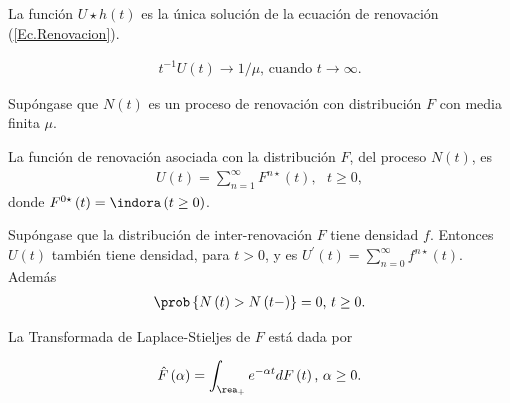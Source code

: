 \begin{Prop}
La funci\'on $U\star h\left(t\right)$ es la \'unica soluci\'on de la ecuaci\'on de renovaci\'on (\ref{Ec.Renovacion}).
\end{Prop}

\begin{Teo}
\begin{eqnarray*}
t^{-1}U\left(t\right)\rightarrow 1/\mu\textrm{,    cuando }t\rightarrow\infty.
\end{eqnarray*}
\end{Teo}

%
%


Sup\'ongase que $N\left(t\right)$ es un proceso de renovaci\'on con distribuci\'on $F$ con media finita $\mu$.

\begin{Def}
La funci\'on de renovaci\'on asociada con la distribuci\'on $F$, del proceso $N\left(t\right)$, es
\begin{eqnarray*}
U\left(t\right)=\sum_{n=1}^{\infty}F^{n\star}\left(t\right),\textrm{   }t\geq0,
\end{eqnarray*}
donde $F^{0\star}\left(t\right)=\indora\left(t\geq0\right)$.
\end{Def}


\begin{Prop}
Sup\'ongase que la distribuci\'on de inter-renovaci\'on $F$ tiene densidad $f$. Entonces $U\left(t\right)$ tambi\'en tiene densidad, para $t>0$, y es $U^{'}\left(t\right)=\sum_{n=0}^{\infty}f^{n\star}\left(t\right)$. Adem\'as
\begin{eqnarray*}
\prob\left\{N\left(t\right)>N\left(t-\right)\right\}=0\textrm{,   }t\geq0.
\end{eqnarray*}
\end{Prop}

\begin{Def}
La Transformada de Laplace-Stieljes de $F$ est\'a dada por

\begin{eqnarray*}
\hat{F}\left(\alpha\right)=\int_{\rea_{+}}e^{-\alpha t}dF\left(t\right)\textrm{,  }\alpha\geq0.
\end{eqnarray*}
\end{Def}

